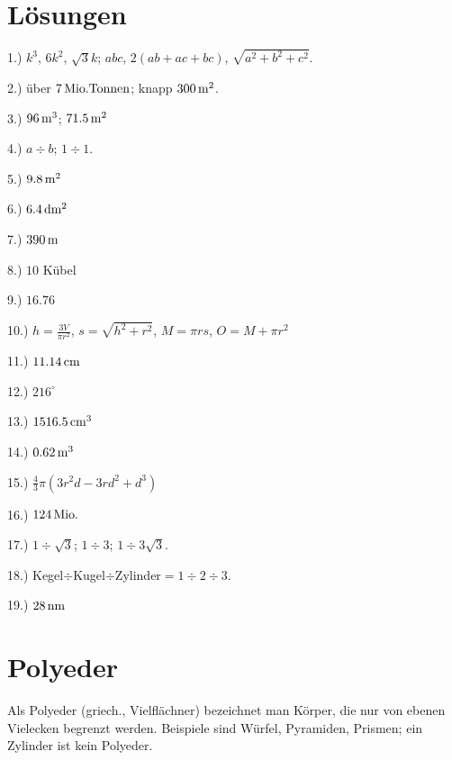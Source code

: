 \documentclass[%
11pt,%
twoside,%
titlepage,%
a4page,%
german,%
headsepline%
]{scrartcl}
\begin{document}
\section*{L\"osungen}

1.) $k^3$, $6k^2$, $\sqrt{3}k$; $abc$, $2(ab+ac+bc)$, $\sqrt{a^2+b^2+c^2}$.

2.) \"uber $\unit[7]{Mio. Tonnen}$; knapp $\unit[300]{m^2}$.

3.) $\unit[96]{m^3}$; $\unit[71.5]{m^2}$

4.) $a\div b$; $1\div1$.

5.) $\unit[9.8]{m^2}$

6.) $\unit[6.4]{dm^2}$

7.) $\unit[390]{m}$

8.) $10$ K\"ubel

9.) $16.76$

10.) $h=\frac{3V}{\pi r^2}$, $s=\sqrt{h^2+r^2}$, $M=\pi rs$, $O=M+\pi r^2$

11.) $\unit[11.14]{cm}$

12.) $216^\circ$

13.) $\unit[1516.5]{cm^3}$

14.) $\unit[0.62]{m^3}$

15.) $\frac{4}{3}\pi(3r^2d-3rd^2+d^3)$

16.) $\unit[124]{Mio.}$

17.) $1\div\sqrt{3}$; $1\div 3$; $1\div 3\sqrt{3}$.

18.) Kegel$\div$Kugel$\div$Zylinder$=1\div2\div3$.

19.) $\unit[28]{nm}$

\clearpage

\section{Polyeder}
Als Polyeder (griech., Vielfl\"achner) bezeichnet man K\"orper, die nur von ebenen Vielecken begrenzt werden. Beispiele sind W\"urfel, Pyramiden, Prismen; ein Zylinder ist kein Polyeder.
\end{document}

